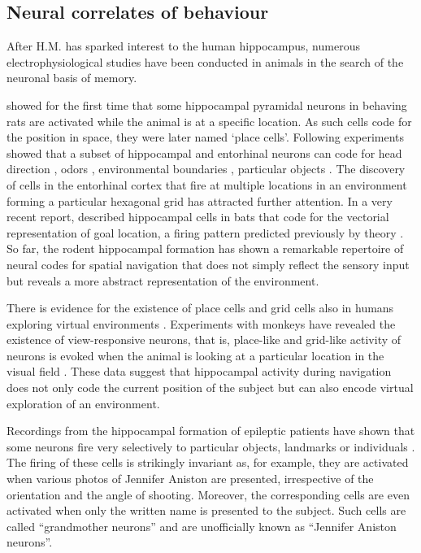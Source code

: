     
  \subsection{Neural correlates of behaviour} 
    After H.M. has sparked interest to the human hippocampus, numerous
    electrophysiological studies have been conducted in animals in the
    search of the neuronal basis of memory.

    \cite{OKeefe1971} showed for the first time that some hippocampal pyramidal
    neurons in behaving rats are activated while the animal is at a specific
    location. As such cells code for the position in space, they were later
    named `place cells'. Following experiments showed that a subset of
    hippocampal and entorhinal neurons can code for head direction
    \citep{Taube1990a, Taube1990b}, odors \citep{Wood1999}, environmental
    boundaries \citep{Jeffery2006}, particular objects \citep{Manns2009}. The
    discovery of cells in the entorhinal cortex that fire at multiple locations
    in an environment forming a particular hexagonal grid \citep{Hafting2005}
    has attracted further attention. In a very recent report, \cite{Sarel2017}
    described hippocampal cells in bats that code for the vectorial
    representation of goal location, a firing pattern predicted previously by
    theory \citep{Stemmler2015}. So far, the rodent hippocampal formation has
    shown a remarkable repertoire of neural codes for spatial navigation that
    does not simply reflect the sensory input but reveals a more abstract
    representation of the environment.
  
    There is evidence for the existence of place cells and grid cells also in
    humans exploring virtual environments \citep{Ekstrom2003, Jacobs2013}.
    Experiments with monkeys have revealed the existence of view-responsive
    neurons, that is, place-like and grid-like activity of neurons is evoked
    when the animal is looking at a particular location in the visual field
    \citep{Rolls1995, Killian2012}. These data suggest that hippocampal
    activity during navigation does not only code the current position of the
    subject but can also encode virtual exploration of an environment.
    
    Recordings from the hippocampal formation of epileptic patients have shown
    that some neurons fire very selectively to particular objects, landmarks or
    individuals \citep{Quiroga2005}. The firing of these cells is strikingly
    invariant as, for example, they are activated when various photos of
    Jennifer Aniston are presented, irrespective of the orientation and the
    angle of shooting. Moreover, the corresponding cells are even activated
    when only the written name is presented to the subject. Such cells are
    called ``grandmother neurons'' and are unofficially known as ``Jennifer
    Aniston neurons''.

